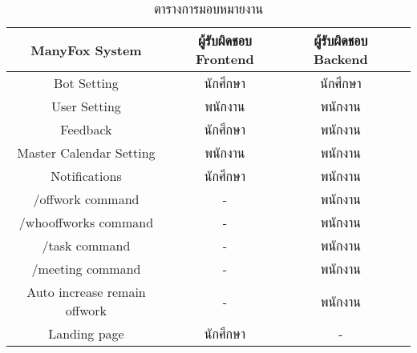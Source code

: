 \begin{table}[!htbp]
	\centering
	\begin{tabular}{cccl}
		\hline
		\multicolumn{1}{|c|}{\textbf{ManyFox System}}      & \multicolumn{1}{c|}{\textbf{ผู้รับผิดชอบ Frontend}} & \multicolumn{1}{c|}{\textbf{ผู้รับผิดชอบ Backend}} \\ \hline
		\multicolumn{1}{|c|}{Bot Setting}                  & \multicolumn{1}{c|}{นักศึกษา}                     & \multicolumn{1}{c|}{นักศึกษา}                    \\ \hline
		\multicolumn{1}{|c|}{User Setting}                 & \multicolumn{1}{c|}{พนักงาน}                     & \multicolumn{1}{c|}{พนักงาน}                    \\ \hline
		\multicolumn{1}{|c|}{Feedback}                     & \multicolumn{1}{c|}{นักศึกษา}                     & \multicolumn{1}{c|}{พนักงาน}                    \\ \hline
		\multicolumn{1}{|c|}{Master Calendar Setting}      & \multicolumn{1}{c|}{พนักงาน}                     & \multicolumn{1}{c|}{พนักงาน}                    \\ \hline
		\multicolumn{1}{|c|}{Notifications}                & \multicolumn{1}{c|}{นักศึกษา}                     & \multicolumn{1}{c|}{พนักงาน}                    \\ \hline
		\multicolumn{1}{|c|}{/offwork command}             & \multicolumn{1}{c|}{-}                          & \multicolumn{1}{c|}{พนักงาน}                    \\ \hline
		\multicolumn{1}{|c|}{/whooffworks command}         & \multicolumn{1}{c|}{-}                          & \multicolumn{1}{c|}{พนักงาน}                    \\ \hline
		\multicolumn{1}{|c|}{/task command}                & \multicolumn{1}{c|}{-}                          & \multicolumn{1}{c|}{พนักงาน}                    \\ \hline
		\multicolumn{1}{|c|}{/meeting command}             & \multicolumn{1}{c|}{-}                          & \multicolumn{1}{c|}{พนักงาน}                    \\ \hline
		\multicolumn{1}{|c|}{Auto increase remain offwork} & \multicolumn{1}{c|}{-}                          & \multicolumn{1}{c|}{พนักงาน}                    \\ \hline
		\multicolumn{1}{|c|}{Landing page}                 & \multicolumn{1}{c|}{นักศึกษา}                     & \multicolumn{1}{c|}{-}                         \\ \hline
	\end{tabular}
	\caption{ตารางการมอบหมายงาน}
\end{table}

